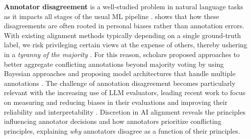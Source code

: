 \documentclass{article}
\begin{document}
\noindent \textbf{Annotator disagreement} is a well-studied problem in natural language tasks \cite{sandri-etal-2023-dont, wang2024aligninglanguagemodelshuman, Cabitza_2023} as it impacts all stages of the usual ML pipeline \cite{plank-2022-problem}. \cite{zhang2024divergingpreferencesannotatorsdisagree} shows that how these disagreements are often rooted in personal biases rather than annotation errors. With existing alignment methods typically depending on a single ground-truth label, we risk privileging certain views at the expense of others, thereby ushering in a \emph{tyranny of the majority} \cite{feffer2023moralmachinetyrannymajority}.
For this reason, scholars proposed approaches to better aggregate conflicting annotations beyond majority voting by using Bayesian approaches \cite{paun-etal-2018-comparing} and proposing model architectures that handle multiple annotations \cite{davani-etal-2022-dealing}.
The challenge of annotation disagreement becomes particularly relevant with the increasing use of LLM evaluators, leading recent work to focus on measuring and reducing biases in their evaluations \cite{liu2024aligning, wu2023stylesubstanceevaluationbiases} and improving their reliability and interpretability \cite{li2024decompose}. Discretion in AI alignment reveals the principles influencing annotator decisions and how annotators prioritize conflicting principles, explaining \emph{why} annotators disagree as a function of their principles. 
\end{document}
